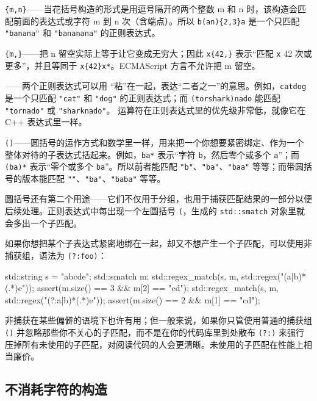 \texttt{\{m,\allowbreak{}n\}}——当花括号构造的形式是用逗号隔开的两个整数 m 和 n 时，该构造会匹配前面的表达式或字符 m 到 n 次（含端点）。所以 \texttt{b(\allowbreak{}an)\allowbreak{}\{2,\allowbreak{}3\}a} 是一个只匹配 \texttt{"banana"} 和 \texttt{"bananana"} 的正则表达式。

\texttt{\{m,\allowbreak{}\}}——把 n 留空实际上等于让它变成无穷大；因此 \texttt{x\{42,\allowbreak{}\}} 表示“匹配 \texttt{x} 42 次或更多”，并且等同于 \texttt{x\{42\}x*}。ECMAScript 方言不允许把 m 留空。

\texttt{\textbar}——两个正则表达式可以用 \texttt{\textbar}“粘”在一起，表达“二者之一”的意思。例如，\texttt{cat\textbar dog} 是一个只匹配 \texttt{"cat"} 和 \texttt{"dog"} 的正则表达式；而 \texttt{(\allowbreak{}tor\textbar shark)\allowbreak{}nado} 能匹配 \texttt{"tornado"} 或 \texttt{"sharknado"}。\texttt{\textbar} 运算符在正则表达式里的优先级非常低，就像它在 C++ 表达式里一样。

\texttt{(\allowbreak{})\allowbreak{}}——圆括号的运作方式和数学里一样，用来把一个你想要紧密绑定、作为一个整体对待的子表达式括起来。例如，\texttt{ba*} 表示“字符 \texttt{b}，然后零个或多个 \texttt{a}”；而 \texttt{(\allowbreak{}ba)\allowbreak{}*} 表示“零个或多个 \texttt{ba}”。所以前者能匹配 \texttt{"b"}、\texttt{"ba"}、\texttt{"baa"} 等等；而带圆括号的版本能匹配 \texttt{""}、\texttt{"ba"}、\texttt{"baba"} 等等。

圆括号还有第二个用途——它们不仅用于分组，也用于捕获匹配结果的一部分以便后续处理。正则表达式中每出现一个左圆括号 \texttt{(\allowbreak{}}，生成的 \texttt{std::\allowbreak{}smatch} 对象里就会多出一个子匹配。

如果你想把某个子表达式紧密地绑在一起，却又不想产生一个子匹配，可以使用非捕获组，语法为 \texttt{(\allowbreak{}?:foo)\allowbreak{}}：

\begin{codebox}[cpp]
    std::string s = "abcde";
    std::smatch m;
    std::regex_match(s, m, std::regex("(a|b)*(.*)e"));
    assert(m.size() == 3 && m[2] == "cd");
    std::regex_match(s, m, std::regex("(?:a|b)*(.*)e"));
    assert(m.size() == 2 && m[1] == "cd");
\end{codebox}

非捕获在某些偏僻的语境下也许有用；但一般来说，如果你只管使用普通的捕获组 \texttt{(\allowbreak{})\allowbreak{}} 并忽略那些你不关心的子匹配，而不是在你的代码库里到处散布 \texttt{(\allowbreak{}?:)\allowbreak{}} 来强行压掉所有未使用的子匹配，对阅读代码的人会更清晰。未使用的子匹配在性能上相当廉价。

\subsection{不消耗字符的构造}

